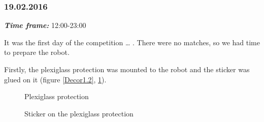 \subsubsection{19.02.2016}
\textit{\textbf{Time frame:}} 12:00-23:00 

It was the first day of the competition … . There were no matches, so we had time to prepare the robot.

Firstly, the plexiglass protection was mounted to the robot and the sticker was glued on it (figure \ref{Decor1.2}, \ref{Decor1.3}).

\begin{figure}[H]
	\begin{minipage}[h]{0.47\linewidth}
		\caption{Plexiglass protection}
		\label{Decor1.2}
	\end{minipage}
	\hfill
	\begin{minipage}[h]{0.47\linewidth}
		\caption{Sticker on the plexiglass protection}
		\label{Decor1.3}
	\end{minipage}
\end{figure}

